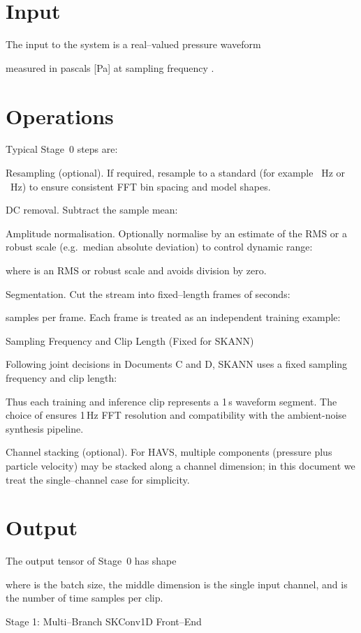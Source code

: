 \documentclass[12pt]{article}
\begin{document}
\section*{Input}
The input to the system is a real–valued pressure waveform


measured in pascals [Pa] at sampling frequency .

\section*{Operations}
Typical Stage 0 steps are:

Resampling (optional). If required, resample to a standard  (for example  Hz or  Hz) to ensure consistent FFT bin spacing and model shapes.

DC removal. Subtract the sample mean:


Amplitude normalisation. Optionally normalise by an estimate of the RMS or a robust scale (e.g. median absolute deviation) to control dynamic range:


where  is an RMS or robust scale and  avoids division by zero.

Segmentation. Cut the stream into fixed–length frames of  seconds:


samples per frame. Each frame is treated as an independent training example:


Sampling Frequency and Clip Length (Fixed for SKANN)

Following joint decisions in Documents C and D, SKANN uses a fixed sampling frequency and clip length:


Thus each training and inference clip represents a 1 s waveform segment. The choice of  ensures 1 Hz FFT resolution and compatibility with the ambient-noise synthesis pipeline.

Channel stacking (optional). For HAVS, multiple components (pressure plus particle velocity) may be stacked along a channel dimension; in this document we treat the single–channel case for simplicity.

\section*{Output}
The output tensor of Stage 0 has shape


where  is the batch size, the middle dimension is the single input channel, and  is the number of time samples per clip.

Stage 1: Multi–Branch SKConv1D Front–End
\end{document}

